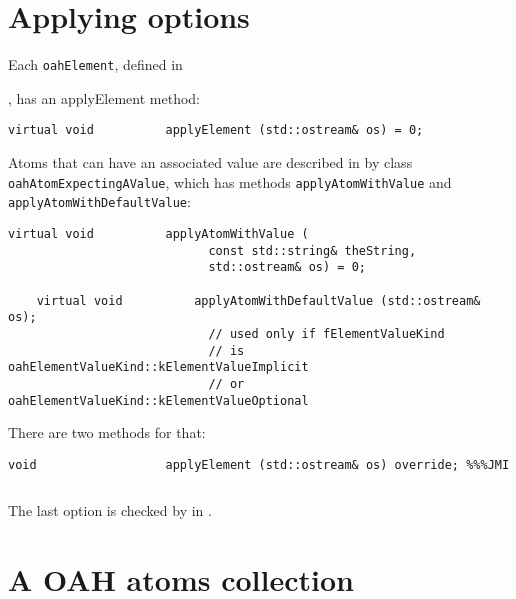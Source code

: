 \section{Applying options}

Each {\tt oahElement}, defined in {, has an applyElement {\tt } method:
\begin{lstlisting}[language=CPlusPlus]
    virtual void          applyElement (std::ostream& os) = 0;
\end{lstlisting}

Atoms that can have an associated value are described in  by class   {\tt oahAtomExpectingAValue}, which has methods {\tt applyAtomWithValue} and {\tt applyAtomWithDefaultValue}:
\begin{lstlisting}[language=CPlusPlus]
    virtual void          applyAtomWithValue (
                            const std::string& theString,
                            std::ostream& os) = 0;

    virtual void          applyAtomWithDefaultValue (std::ostream& os);
                            // used only if fElementValueKind
                            // is oahElementValueKind::kElementValueImplicit
                            // or oahElementValueKind::kElementValueOptional
\end{lstlisting}

There are two methods for that:%
\begin{lstlisting}[language=CPlusPlus]
    void                  applyElement (std::ostream& os) override; %%%JMI
\end{lstlisting}

\begin{lstlisting}[language=CPlusPlus]

\end{lstlisting}

The last option is checked by  in . %


\section{A OAH atoms collection}

}
